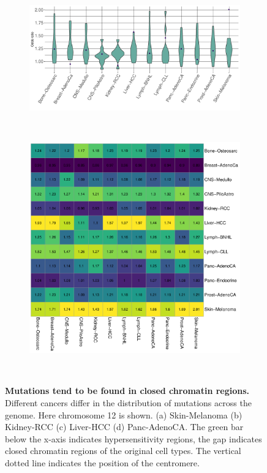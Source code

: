 \begin{figure}[htbp]
    \begin{subfigure}{\textwidth}
    \centering
    \includegraphics[scale=0.6]{graphics/mixed_or_violin.pdf}
    \caption{}
    \label{fig:mixed_or_violin}
    \end{subfigure}
    ~
    \begin{subfigure}{\textwidth}
    \centering
    \includegraphics[scale=0.6]{graphics/mixed_or_heatmap.pdf}
    \caption{}
    \label{fig:mixed_or_heatmap}
    \end{subfigure} \\
    \vspace{0.5cm}

    \caption{\textbf{Mutations tend to be found in closed chromatin regions.} Different cancers differ in the distribution of mutations across the genome. Here chromosome 12 is shown. (a) Skin-Melanoma (b) Kidney-RCC (c) Liver-HCC (d) Panc-AdenoCA. The green bar below the x-axis indicates hypersensitivity regions, the gap indicates closed chromatin regions of the original cell types. The vertical dotted line indicates the position of the centromere.}
    \label{fig:mixed_or}
\end{figure}